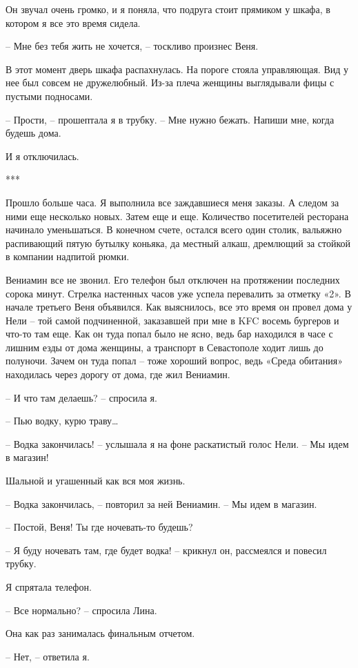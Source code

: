\documentclass[
]{book}
\begin{document}
Он звучал очень громко, и я поняла, что подруга стоит прямиком у шкафа, в котором я все это время сидела.

-- Мне без тебя жить не хочется, -- тоскливо произнес Веня.

В этот момент дверь шкафа распахнулась. На пороге стояла управляющая. Вид у нее был совсем не дружелюбный. Из-за плеча женщины выглядывали фицы с пустыми подносами.

-- Прости, -- прошептала я в трубку. -- Мне нужно бежать. Напиши мне, когда будешь дома.

И я отключилась.

***

Прошло больше часа. Я выполнила все заждавшиеся меня заказы. А следом за ними еще несколько новых. Затем еще и еще. Количество посетителей ресторана начинало уменьшаться. В конечном счете, остался всего один столик, вальяжно распивающий пятую бутылку коньяка, да местный алкаш, дремлющий за стойкой в компании надпитой рюмки.

Вениамин все не звонил. Его телефон был отключен на протяжении последних сорока минут. Стрелка настенных часов уже успела перевалить за отметку «2». В начале третьего Веня объявился. Как выяснилось, все это время он провел дома у Нели -- той самой подчиненной, заказавшей при мне в KFC восемь бургеров и что-то там еще. Как он туда попал было не ясно, ведь бар находился в часе с лишним езды от дома женщины, а транспорт в Севастополе ходит лишь до полуночи. Зачем он туда попал -- тоже хороший вопрос, ведь «Среда обитания» находилась через дорогу от дома, где жил Вениамин.

-- И что там делаешь? -- спросила я.

-- Пью водку, курю траву\ldots{}

-- Водка закончилась! -- услышала я на фоне раскатистый голос Нели. -- Мы идем в магазин!

Шальной и угашенный как вся моя жизнь.

-- Водка закончилась, -- повторил за ней Вениамин. -- Мы идем в магазин.

-- Постой, Веня! Ты где ночевать-то будешь?

-- Я буду ночевать там, где будет водка! -- крикнул он, рассмеялся и повесил трубку.

Я спрятала телефон.

-- Все нормально? -- спросила Лина.

Она как раз занималась финальным отчетом.

-- Нет, -- ответила я.
\end{document}
